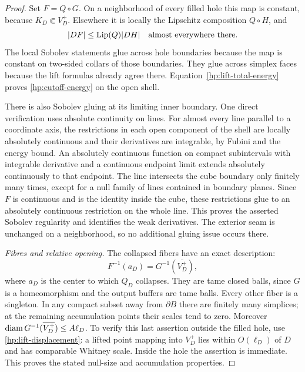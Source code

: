\begin{proof}
Set $F=Q\circ G$.  On a neighborhood of every filled hole this map
is constant, because $K_D\Subset V_D^+$.  Elsewhere it is locally
the Lipschitz composition $Q\circ H$, and
\[
 |DF|\leq\operatorname{Lip}(Q)|DH|\quad\text{almost everywhere there}.
\]
The local Sobolev statements glue across hole boundaries because the
map is constant on two-sided collars of those boundaries.  They glue
across simplex faces because the lift formulas already agree there.
Equation~\eqref{hp:lift-total-energy} proves
\eqref{hp:cutoff-energy} on the open shell.

There is also Sobolev gluing at its limiting inner boundary.  One
direct verification uses absolute continuity on lines.  For almost
every line parallel to a coordinate axis, the restrictions in each
open component of the shell are locally absolutely continuous and
their derivatives are integrable, by Fubini and the energy bound.
An absolutely continuous function on compact subintervals with
integrable derivative and a continuous endpoint limit extends
absolutely continuously to that endpoint.  The line intersects the
cube boundary only finitely many times, except for a null family of
lines contained in boundary planes.  Since $F$ is continuous and is
the identity inside the cube, these restrictions glue to an
absolutely continuous restriction on the whole line.  This proves
the asserted Sobolev regularity and identifies the weak derivatives.
The exterior seam is unchanged on a neighborhood, so no additional
gluing issue occurs there.

\emph{Fibres and relative opening.}
The collapsed fibers have an exact description:
\[
 F^{-1}(a_D)=G^{-1}(\overline{V_D^+}),
\]
where $a_D$ is the center to which $Q_D$ collapses.  They are tame
closed balls, since $G$ is a homeomorphism and the output buffers
are tame balls.  Every other fiber is a singleton.  In any compact
subset away from $\partial B$ there are finitely many simplices;
at the remaining accumulation points their scales tend to zero.
Moreover $\operatorname{diam} G^{-1}(\overline{V_D^+})\leq A\ell_D$.  To verify
this last assertion outside the filled hole, use
\eqref{hp:lift-displacement}: a lifted point mapping into $V_D^+$
lies within $O(\ell_D)$ of $D$ and has comparable Whitney scale.
Inside the hole the assertion is immediate.  This proves the stated
null-size and accumulation properties.


\end{proof}
